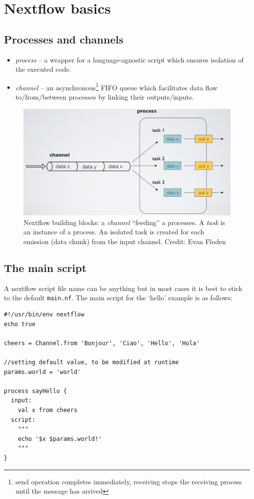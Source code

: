 \section{Nextflow basics}

\subsection{Processes and channels}


\begin{itemize}
\item \emph{process} -- a wrapper for a language-agnostic script which ensures isolation of the executed code.
\item \emph{channel} -- an asynchronous\footnote{send operation completes immediately, receiving stops the receiving process until the message has arrived} FIFO queue which facilitates data flow to/from/between processes by linking their outputs/inputs.
\end{itemize}


\begin{figure}[H]
\centering
\includegraphics[width=.8\textwidth]{handout/channel-process.png}
\caption{Nextflow building blocks: a \emph{channel} ``feeding'' a processes. 
A \emph{task} is an instance of a process. An isolated task is created for each emission (data chunk) from the input channel. Credit: Evan Floden}
\label{fig:proc-chn}
\end{figure}


\subsection{The main script}

A nextflow script file name can be anything but in most cases it is best to stick to the default \texttt{main.nf}. 
The main script for the `hello' example is as follows:


\begin{lstlisting}
#!/usr/bin/env nextflow
echo true

cheers = Channel.from 'Bonjour', 'Ciao', 'Hello', 'Hola'

//setting default value, to be modified at runtime 
params.world = 'world' 

process sayHello {
  input:
    val x from cheers
  script:
    """
    echo '$x $params.world!'
    """
}
\end{lstlisting}



